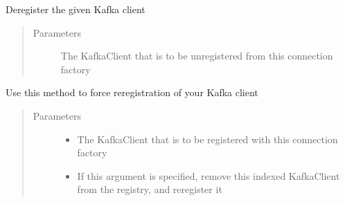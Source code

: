 \documentclass[letterpaper,10pt,english]{sphinxmanual}
\begin{document}
\begin{fulllineitems}
\begin{fulllineitems}
\label{\detokenize{Forge:Forge.KafkaConnectionFactory.deregister}}
\sphinxAtStartPar
De\sphinxhyphen{}register the given Kafka client
\begin{quote}\begin{description}
\item[{Parameters}] \leavevmode
\sphinxAtStartPar
{} \textendash{} The KafkaClient that is to be unregistered from this connection factory

\end{description}\end{quote}

\end{fulllineitems}


\begin{fulllineitems}
\label{\detokenize{Forge:Forge.KafkaConnectionFactory.force_register}}
\sphinxAtStartPar
Use this method to force re\sphinxhyphen{}registration of your Kafka client
\begin{quote}\begin{description}
\item[{Parameters}] \leavevmode\begin{itemize}
\item {} 
\sphinxAtStartPar
{} \textendash{} The KafkaClient that is to be registered with this connection factory

\item {} 
\sphinxAtStartPar
{} \textendash{} If this argument is specified, remove this indexed KafkaClient from the registry, and
re\sphinxhyphen{}register it


\end{itemize}
\end{description}
\end{quote}
\end{fulllineitems}
\end{fulllineitems}
\end{document}
